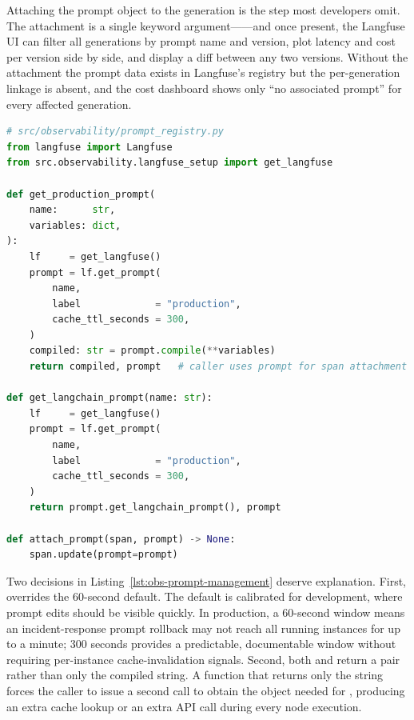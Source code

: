 Attaching the prompt object to the generation is the step most
developers omit. The attachment is a single  keyword
argument------and once
present, the Langfuse UI can filter all generations by prompt name and
version, plot latency and cost per version side by side, and display a
diff between any two versions. Without the attachment the prompt data
exists in Langfuse's registry but the per-generation linkage is absent,
and the cost dashboard shows only ``no associated prompt'' for every
affected generation.

\begin{lstlisting}[language=Python,
  caption={Production-labelled prompt fetch with 5-minute cache;
  LangChain-compatible variant; span attachment helper},
  label={lst:obs-prompt-management}]
# src/observability/prompt_registry.py
from langfuse import Langfuse
from src.observability.langfuse_setup import get_langfuse

def get_production_prompt(
    name:      str,
    variables: dict,
):
    lf     = get_langfuse()
    prompt = lf.get_prompt(
        name,
        label             = "production",
        cache_ttl_seconds = 300,
    )
    compiled: str = prompt.compile(**variables)
    return compiled, prompt   # caller uses prompt for span attachment

def get_langchain_prompt(name: str):
    lf     = get_langfuse()
    prompt = lf.get_prompt(
        name,
        label             = "production",
        cache_ttl_seconds = 300,
    )
    return prompt.get_langchain_prompt(), prompt

def attach_prompt(span, prompt) -> None:
    span.update(prompt=prompt)
\end{lstlisting}

Two decisions in Listing~\ref{lst:obs-prompt-management} deserve
explanation. First,  overrides the
60-second default. The default is calibrated for development, where
prompt edits should be visible quickly. In production, a 60-second
window means an incident-response prompt rollback may not reach all
running instances for up to a minute; 300 seconds provides a
predictable, documentable window without requiring per-instance
cache-invalidation signals. Second, both 
and  return a 
pair rather than only the compiled string. A function that returns only
the string forces the caller to issue a second  call
to obtain the object needed for , producing an
extra cache lookup or an extra API call during every node execution.

